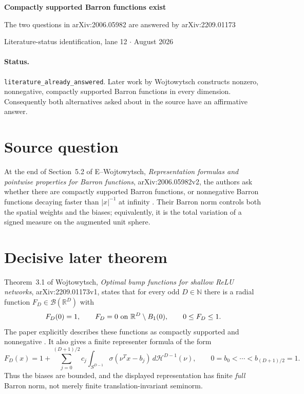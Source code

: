 \documentclass[10pt]{article}
\newcommand{\R}{\mathbb R}
\newcommand{\B}{\mathcal B}
\begin{document}
\begin{center}
{\LARGE\bfseries Compactly supported Barron functions exist}\par
\vspace{0.25em}
{\large The two questions in arXiv:2006.05982 are answered by arXiv:2209.01173}\par
\vspace{0.65em}
Literature-status identification, lane 12 \quad $\cdot$  August 2026
\end{center}
\vspace{0.4em}

\paragraph{Status.}
\texttt{literature\_already\_answered}.  Later work by Wojtowytsch constructs
nonzero, nonnegative, compactly supported Barron functions in every dimension.
Consequently both alternatives asked about in the source have an affirmative
answer.

\section*{Source question}

At the end of Section~5.2 of E--Wojtowytsch,
\emph{Representation formulas and pointwise properties for Barron functions},
arXiv:2006.05982v2, the authors ask whether there are compactly supported
Barron functions, or nonnegative Barron functions decaying faster than
$|x|^{-1}$ at infinity \cite{EW}.  Their Barron norm controls both the spatial
weights and the biases; equivalently, it is the total variation of a signed
measure on the augmented unit sphere.

\section*{Decisive later theorem}

Theorem~3.1 of Wojtowytsch, \emph{Optimal bump functions for shallow ReLU
networks}, arXiv:2209.01173v1, states that for every odd $D\in\mathbb N$ there
is a radial function $F_D\in\B(\R^D)$ with
\[
 F_D(0)=1,\qquad F_D=0\ \hbox{on }\R^D\setminus B_1(0),
 \qquad 0\leq F_D\leq1.
\]
The paper explicitly describes these functions as compactly supported and
nonnegative \cite{W}.  It also gives a finite representer formula of the form
\[
 F_D(x)=1+\sum_{j=0}^{(D+1)/2}c_j
 \int_{S^{D-1}}\!\sigma(\nu^Tx-b_j)\,d\mathcal H^{D-1}(\nu),
 \qquad 0=b_0<\cdots<b_{(D+1)/2}=1.
\]
Thus the biases are bounded, and the displayed representation has finite
\emph{full} Barron norm, not merely finite translation-invariant seminorm.
\end{document}
